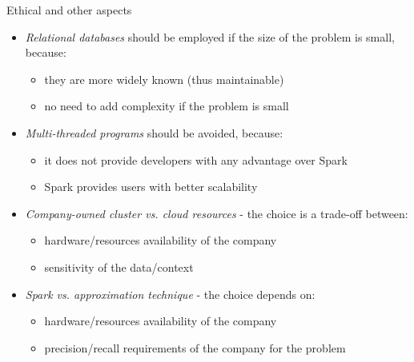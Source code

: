 \begin{block}{Ethical and other aspects}
\begin{itemize}
    \item \emph{Relational databases} should be employed if the size of the problem is small, because:
    \begin{itemize}
        \item they are more widely known (thus maintainable)
        \item no need to add complexity if the problem is small
    \end{itemize}
    \item \emph{Multi-threaded programs} should be avoided, because:
    \begin{itemize}
        \item it does not provide developers with any advantage over Spark
        \item Spark provides users with better scalability
    \end{itemize}
    \item \emph{Company-owned cluster vs. cloud resources} - the choice is a trade-off between:
    \begin{itemize}
        \item hardware/resources availability of the company
        \item sensitivity of the data/context
    \end{itemize}
    \item \emph{Spark vs. approximation technique} - the choice depends on:
    \begin{itemize}
        \item hardware/resources availability of the company
        \item precision/recall requirements of the company for the problem
    \end{itemize}
\end{itemize}

\end{block}